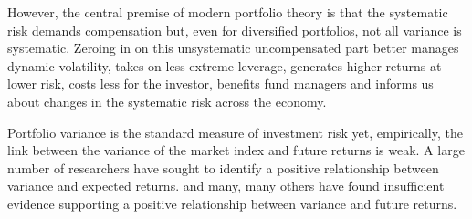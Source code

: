 However, the central premise of modern portfolio theory is that the systematic risk demands compensation but, even for diversified portfolios, not all variance is systematic. \citep{markowitz_portfolio_1952} Zeroing in on this unsystematic uncompensated part better manages dynamic volatility, takes on less extreme leverage, generates higher returns at lower risk, costs less for the investor, benefits fund managers and informs us about changes in the systematic risk across the economy. 

Portfolio variance is the standard measure of investment risk yet, empirically, the link between the variance of the market index and future returns is weak. A large number of researchers have sought to identify a positive relationship between variance and expected returns. \citet{haugen_1972,FRENCH19873,glosten_1993,ang_cross-section_2006} and many, many others have found insufficient evidence supporting a positive relationship between variance and future returns. 
